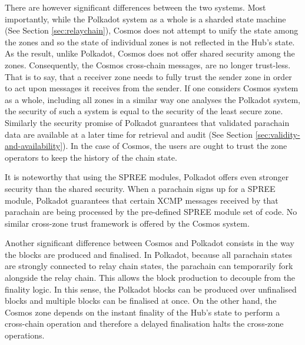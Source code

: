There are however significant differences between the two systems. Most importantly, while the Polkadot system as a whole is a sharded state machine (See Section \ref{sec:relaychain}), Cosmos does not attempt to unify the state among the zones and so the state of individual zones is not reflected in the Hub's state. As the result, unlike Polkadot, Cosmos does not offer shared security among the zones. Consequently, the Cosmos cross-chain messages, are no longer trust-less. That is to say, that a receiver zone needs to fully trust the sender zone in order to act upon messages it receives from the sender. If one considers Cosmos system as a whole, including all zones in a similar way one analyses the Polkadot system, the security of such a system is equal to the security of the least secure zone. Similarly the security promise of Polkadot guarantees that validated parachain data are available at a later time for retrieval and audit (See Section \ref{sec:validity-and-availability}). In the case of Cosmos, the users are ought to trust the zone operators to keep the history of the chain state.

It is noteworthy that using the SPREE modules, Polkadot offers even stronger security than the shared security.
When a parachain signs up for a SPREE module, Polkadot guarantees that certain XCMP messages received by that parachain are being processed by the pre-defined SPREE module set of code. No similar cross-zone trust framework is offered by the Cosmos system.

Another significant difference between Cosmos and Polkadot consists in the way the blocks are produced and finalised. In Polkadot, because all parachain states are strongly connected to relay chain states, the parachain can temporarily fork alongside the relay chain. This allows the block production to decouple from the finality logic. In this sense, the Polkadot blocks can be produced over unfinalised blocks and multiple blocks can be finalised at once. On the other hand, the Cosmos zone depends on the instant finality of the Hub's state to perform a cross-chain operation and therefore a delayed finalisation halts the cross-zone operations.

